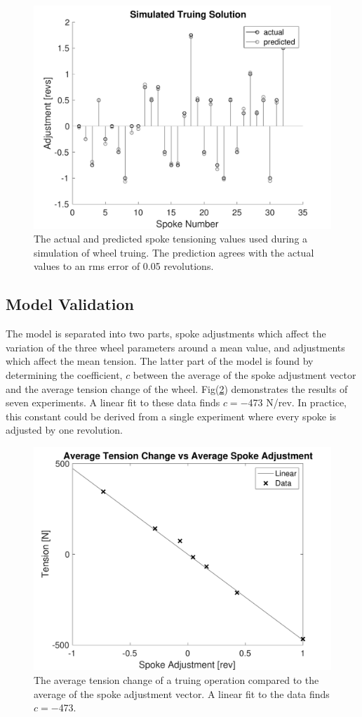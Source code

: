 \documentclass[journal]{IEEEtran}
\begin{document}
\begin{figure}[!t]
\centering
\includegraphics[width=3.25 in]{./figs/simd}
\caption{The actual and predicted spoke tensioning values used during a simulation of wheel truing.  The prediction agrees with the actual values to an rms error of 0.05 revolutions.}
\label{fig:simd}
\end{figure}

\subsection{Model Validation}
The model is separated into two parts, spoke adjustments which affect the variation of the three wheel parameters around a mean value, and adjustments which affect the mean tension.  The latter part of the model is found by determining the coefficient, $c$ between the average of the spoke adjustment vector and the average tension change of the wheel.  Fig(\ref{fig:c}) demonstrates the results of seven experiments. A linear fit to these data finds $c=-$473 N/rev. In practice, this constant could be derived from a single experiment where every spoke is adjusted by one revolution. 

 \begin{figure}[!t]
\centering
\includegraphics[width=3.25 in]{./figs/c}
\caption{The average tension change of a truing operation compared to the average of the spoke adjustment vector. A linear fit to the data  finds $c=-$473.}
\label{fig:c}
\end{figure}
\end{document}
